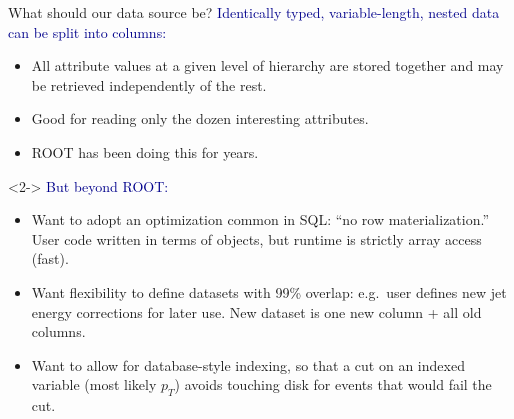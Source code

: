 \documentclass[aspectratio=169]{beamer}
\begin{document}

\begin{frame}{What should our data source be?}
\vspace{0.5 cm}
\textcolor{darkblue}{Identically typed, variable-length, nested data can be split into columns:}
\begin{itemize}
\item All attribute values at a given level of hierarchy are stored together and may be retrieved independently of the rest.
\item Good for reading only the dozen interesting attributes.
\item ROOT has been doing this for years.
\end{itemize}

\begin{uncoverenv}<2->
\vspace{0.25 cm}
\textcolor{darkblue}{But beyond ROOT:}
\begin{itemize}
\item<2-> Want to adopt an optimization common in SQL: ``no row materialization.'' \\ User code written in terms of objects, but runtime is strictly array access (fast).
\item<3-> Want flexibility to define datasets with 99\% overlap: e.g.\ user defines new jet energy corrections for later use. New dataset is one new column + all old columns.
\item<4-> Want to allow for database-style indexing, so that a cut on an indexed variable (most likely $p_T$) avoids touching disk for events that would fail the cut.
\end{itemize}
\end{uncoverenv}
\end{frame}
\end{document}
